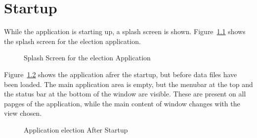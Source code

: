 \chapter{Startup}
While the application is starting up, a splash screen is shown.
Figure~\ref{splash} shows the splash screen for the election application.

\begin{figure}[htbp]
\caption{\label{splash}Splash Screen for the election Application}
\begin{center}
\end{center}
\end{figure}

Figure~\ref{empty} shows the application afrer the startup, but before data files have been loaded. The main application area is empty, but the menubar at the top and the status bar at the bottom of the window are visible. These are present on all papges of the application, while the main content of window changes with the view chosen.

\begin{figure}[htbp]
\caption{\label{empty}Application election After Startup}
\begin{center}
\end{center}
\end{figure}

